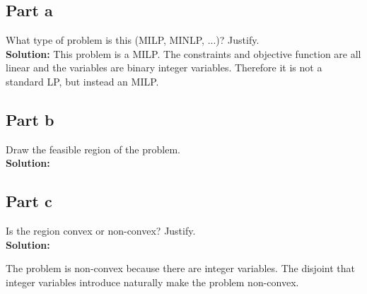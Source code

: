 \documentclass[11pt]{article}
\begin{document}
\subsection{Part a}
What type of problem is this (MILP, MINLP, ...)? Justify.
\\
\textbf{Solution: }
This problem is a MILP. 
The constraints and objective function are all linear and the variables are binary integer variables.
Therefore it is not a standard LP, but instead an MILP.

\subsection{Part b}
Draw the feasible region of the problem.
\\
\textbf{Solution: }


\subsection{Part c}
Is the region convex or non-convex? Justify.
\\
\textbf{Solution: }

The problem is non-convex because there are integer variables. 
The disjoint that integer variables introduce naturally make the problem non-convex.
\end{document}
